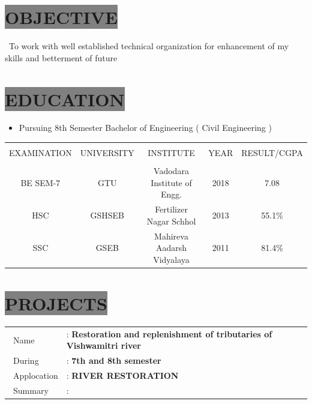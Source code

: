 \documentclass{res} %
\begin{document}
\begin{resume}

\section{
\colorbox{grey}{OBJECTIVE}
   }   
\ To work with well established technical organization for enhancement of my skills and betterment of future
 

\section{
\colorbox{grey}{EDUCATION}  
}
\begin{itemize}
\item Pursuing 8th Semester Bachelor of Engineering ( Civil Engineering )
\end{itemize}    

\begin{table}[ht] 
 \centering%
\begin{tabular}{||c|c|c|c|c||} %
\hline
\hline\\ [.5ex] %
EXAMINATION & UNIVERSITY & INSTITUTE & YEAR & RESULT/CGPA \\ [.5ex] %
\hline
\hline\\ [.5ex]
BE SEM-7 & GTU & Vadodara Institute of Engg. & 2018 & 7.08 \\ [.5ex] %
HSC & GSHSEB & Fertilizer Nagar Schhol & 2013 & 55.1{\%} \\ [.5ex] 
SSC & GSEB & Mahireva Aadarsh Vidyalaya & 2011 & 81.4{\%} \\ [1ex]
\hline %
\end{tabular}
\label{table:lin} %
\end{table}




\section{
\colorbox{grey}{PROJECTS}
}

\begin{tabular}{ l l}
\ Name &  {:} \textbf{Restoration and replenishment of tributaries of Vishwamitri river}\\ [0.5ex]
\ During & {:}  \textbf{7th and 8th semester} \\ [0.5ex]
\ Applocation  &  {:} \bf RIVER RESTORATION  \\ [0.5ex]
\ Summary & {:} \\
\end{tabular}


\end{resume}
\end{document}
